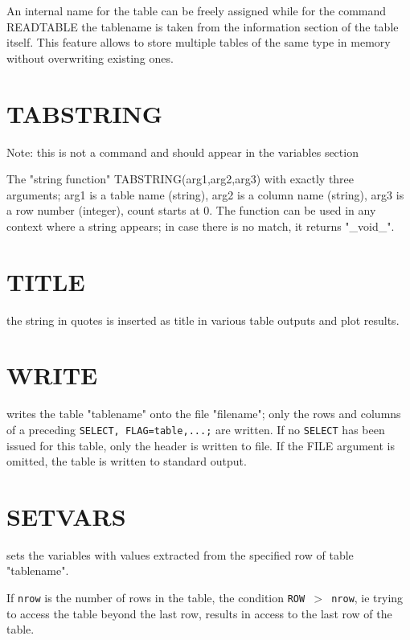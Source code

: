 An internal name for the table can be freely assigned while for the
command READTABLE the tablename is taken from the information section of
the table itself.  
This feature allows to store multiple tables of the same type in memory without
overwriting existing ones.   

\section{TABSTRING}
\label{sec:tabstring}
Note: this is not a command and should appear in the variables section

The "string function" TABSTRING(arg1,arg2,arg3) with exactly  three
arguments; arg1 is a table name (string), arg2 is a column name
(string), arg3 is a row number (integer), count starts at 0. The
function can be used in any context where a string appears; in case
there is no match, it returns "\_void\_".  

\section{TITLE}
\label{sec:title}
the string in quotes is inserted as title in various table outputs and
plot results.  

\section{WRITE}
\label{sec:write}
writes the table "tablename" onto the file "filename"; only the rows and
columns of a preceding \texttt{SELECT, FLAG=table,...;} are written. 
If no \texttt{SELECT} has been issued for this table, only the header is
written to file.
If the FILE argument is omitted, the table is written to standard output.  



\section{SETVARS}
\label{sec:setvars}

sets the variables with values extracted
from the specified row of table "tablename".

If \texttt{nrow} is the number of rows in the table, the condition
\texttt{ROW $>$ nrow}, ie trying to access the table beyond the last row,
results in access to the last row of the table. 


